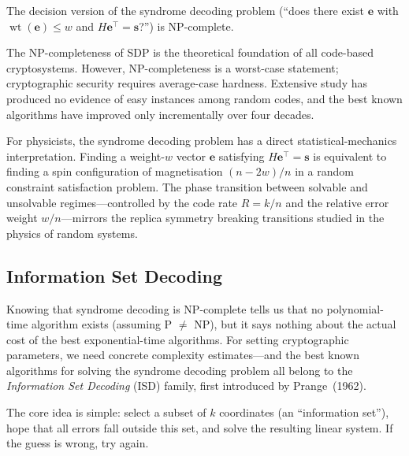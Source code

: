 \begin{theorem}
\label{thm:sdp-np}
The decision version of the syndrome decoding problem (``does there exist $\mathbf{e}$ with $\operatorname{wt}(\mathbf{e}) \leq w$ and $H\mathbf{e}^\top = \mathbf{s}$?'') is NP-complete.
\end{theorem}

The NP-completeness of SDP is the theoretical foundation of all code-based cryptosystems.  However, NP-completeness is a worst-case statement; cryptographic security requires average-case hardness.  Extensive study has produced no evidence of easy instances among random codes, and the best known algorithms have improved only incrementally over four decades.

For physicists, the syndrome decoding problem has a direct statistical-mechanics interpretation.  Finding a weight-$w$ vector $\mathbf{e}$ satisfying $H\mathbf{e}^\top = \mathbf{s}$ is equivalent to finding a spin configuration of magnetisation $(n - 2w)/n$ in a random constraint satisfaction problem.  The phase transition between solvable and unsolvable regimes---controlled by the code rate $R = k/n$ and the relative error weight $w/n$---mirrors the replica symmetry breaking transitions studied in the physics of random systems.


\subsection{Information Set Decoding}
\label{subsec:isd}

Knowing that syndrome decoding is NP-complete tells us that no polynomial-time algorithm exists (assuming P $\neq$ NP), but it says nothing about the actual cost of the best exponential-time algorithms.  For setting cryptographic parameters, we need concrete complexity estimates---and the best known algorithms for solving the syndrome decoding problem all belong to the \emph{Information Set Decoding} (ISD) family, first introduced by Prange~(1962).

The core idea is simple: select a subset of $k$ coordinates (an ``information set''), hope that all errors fall outside this set, and solve the resulting linear system.  If the guess is wrong, try again.

